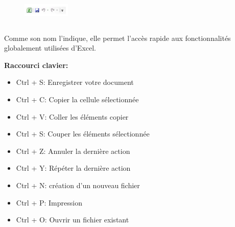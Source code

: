 	\begin{figure}
		\vspace{-2pt}
		\begin{center}
			\includegraphics[width=0.2\textwidth]{img/barre_access_rapide}
		\end{center}  
		\vspace{-2pt}  
	\end{figure}
\subsection*{}
\begin{definition}
	
	Comme son nom l’indique, elle permet l'accès rapide aux fonctionnalités globalement utilisées d'Excel.
 
  \textbf{Raccourci clavier: }
 \begin{itemize}
 	\item Ctrl + S: Enregistrer votre document
 	\item Ctrl + C: Copier la cellule sélectionnée
 	\item Ctrl + V: Coller les éléments copier
 	\item Ctrl + S: Couper les éléments sélectionnée
 	\item Ctrl + Z: Annuler la dernière action
 	\item Ctrl + Y: Répéter la dernière action 
 	\item Ctrl + N:  création d'un nouveau fichier
 	\item Ctrl + P: Impression
 	\item Ctrl + O: Ouvrir un fichier existant 	
 \end{itemize}
\end{definition}
\begin{figure}
 
\end{figure}
